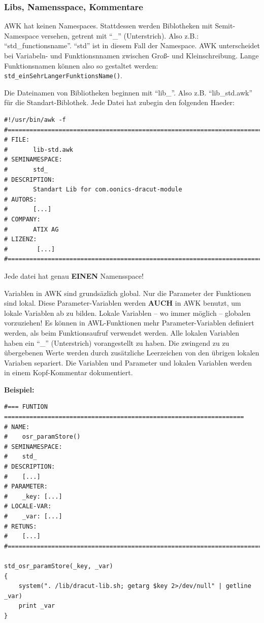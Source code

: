 \documentclass[10pt,a4paper]{article}
\begin{document}
\subsubsection{Libs, Namensspace, Kommentare}

AWK hat keinen Namespaces. Stattdessen werden Biblotheken mit Semit-Namespace versehen, getrent mit "`\_"' (Unterstrich). Also z.B.: "`std\_functionsname"'. "`std"' ist in diesem Fall der Namespace. AWK unterscheidet bei Variabeln- und Funktionsnnamen zwischen Groß- und Kleinschreibung. Lange Funktionsnamen können also so gestaltet werden: \texttt{std\_einSehrLangerFunktionsName()}.


Die Dateinamen von Bibliotheken beginnen mit "`lib\_"'. Also z.B. "`lib\_std.awk"' für die Standart-Biblothek. Jede Datei hat zubegin den folgenden Haeder:

\begin{lstlisting}
#!/usr/bin/awk -f
#==============================================================================
# FILE:
#       lib-std.awk
# SEMINAMESPACE:
#       std_
# DESCRIPTION:
#       Standart Lib for com.oonics-dracut-module
# AUTORS:
#       [...]
# COMPANY:
#       ATIX AG
# LIZENZ:
#        [...]
#==============================================================================
\end{lstlisting}
Jede datei hat genau \textbf{EINEN} Namensspace!


\bigskip 


Variablen in AWK sind grundsäzlich global. Nur die Parameter der Funktionen sind lokal. Diese Parameter-Variablen werden \textbf{AUCH} in AWK benutzt, um lokale Variablen ab zu bilden. Lokale Variablen -- wo immer möglich -- globalen vorzuziehen! Es können in AWL-Funktionen mehr Parameter-Variablen definiert werden, als beim Funktionsaufruf verwendet werden. Alle lokalen Variablen haben ein  "`\_"' (Unterstrich) vorangestellt zu haben. Die zwingend zu zu übergebenen Werte werden durch zusätzliche Leerzeichen von den übrigen lokalen Variaben separiert. Die Variablen und Parameter und lokalen Variablen werden in einem Kopf-Kommentar dokumentiert.


\bigskip 
\textbf{Beispiel:}


\begin{lstlisting}
#=== FUNTION ==================================================================
# NAME:
#    osr_paramStore()
# SEMINAMESPACE:
#    std_
# DESCRIPTION:
#    [...]
# PARAMETER:
#    _key: [...]
# LOCALE-VAR:
#    _var: [...]
# RETUNS:
#    [...]
#==============================================================================

std_osr_paramStore(_key, _var)
{
    system(". /lib/dracut-lib.sh; getarg $key 2>/dev/null" | getline _var)
    print _var
}
\end{lstlisting}
\end{document}
